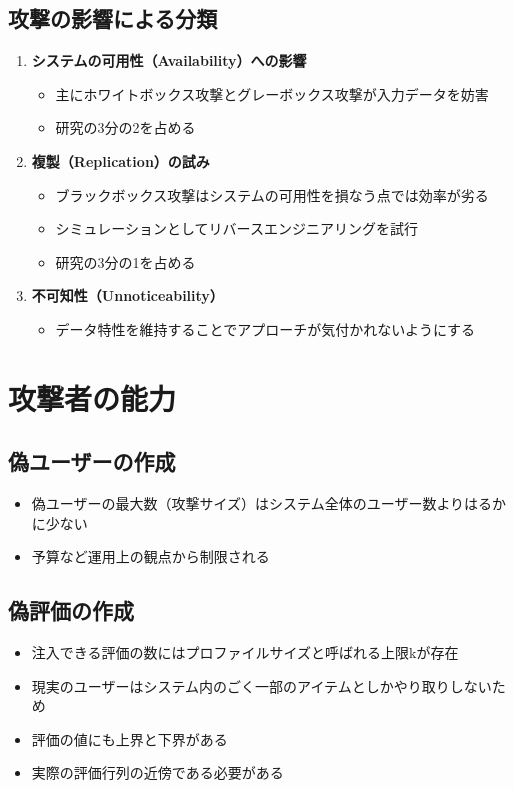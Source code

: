 \documentclass[11pt,a4paper]{article}
\begin{document}
\subsection{攻撃の影響による分類}
\begin{enumerate}
    \item \textbf{システムの可用性（Availability）への影響}
    \begin{itemize}
        \item 主にホワイトボックス攻撃とグレーボックス攻撃が入力データを妨害
        \item 研究の3分の2を占める
    \end{itemize}
    
    \item \textbf{複製（Replication）の試み}
    \begin{itemize}
        \item ブラックボックス攻撃はシステムの可用性を損なう点では効率が劣る
        \item シミュレーションとしてリバースエンジニアリングを試行
        \item 研究の3分の1を占める
    \end{itemize}
    
    \item \textbf{不可知性（Unnoticeability）}
    \begin{itemize}
        \item データ特性を維持することでアプローチが気付かれないようにする
    \end{itemize}
\end{enumerate}

\section{攻撃者の能力}

\subsection{偽ユーザーの作成}
\begin{itemize}
    \item 偽ユーザーの最大数（攻撃サイズ）はシステム全体のユーザー数よりはるかに少ない
    \item 予算など運用上の観点から制限される
\end{itemize}

\subsection{偽評価の作成}
\begin{itemize}
    \item 注入できる評価の数にはプロファイルサイズと呼ばれる上限kが存在
    \item 現実のユーザーはシステム内のごく一部のアイテムとしかやり取りしないため
    \item 評価の値にも上界と下界がある
    \item 実際の評価行列の近傍である必要がある
\end{itemize}
\end{document}
